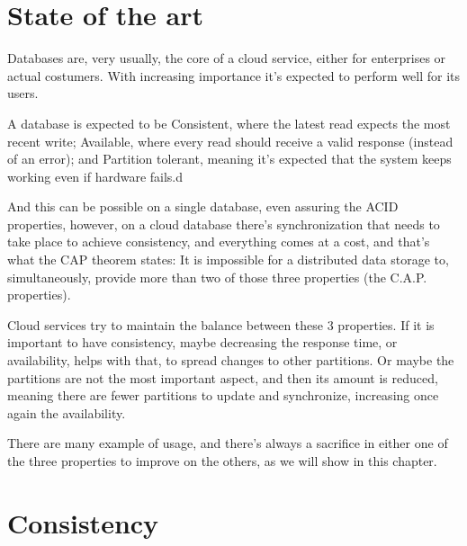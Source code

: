 \documentclass[14pt,oneside]{extreport}
\newcommand*\fpar{\hspace{1ex}}
\begin{document}
  \section{State of the art}
  \fpar Databases are, very usually, the core of a cloud service, either for enterprises or actual costumers. With increasing importance it's expected to perform well for its users.
  \par A database is expected to be Consistent, where the latest read expects the most recent write; Available, where every read should receive a valid response (instead of an error); and Partition tolerant, meaning it's expected that the system keeps working even if hardware fails.d
  \par And this can be possible on a single database, even assuring the ACID properties, however, on a cloud database there's synchronization that needs to take place to achieve consistency, and everything comes at a cost, and that's what the CAP theorem states: It is impossible for a distributed data storage to, simultaneously, provide more than two of those three properties (the C.A.P. properties).
  \par Cloud services try to maintain the balance between these 3 properties. If it is important to have consistency, maybe decreasing the response time, or availability, helps with that, to spread changes to other partitions. Or maybe the partitions are not the most important aspect, and then its amount is reduced, meaning there are fewer partitions to update and synchronize, increasing once again the availability.
  \par There are many example of usage, and there's always a sacrifice in either one of the three properties to improve on the others, as we will show in this chapter.

  \section{Consistency}
\end{document}
